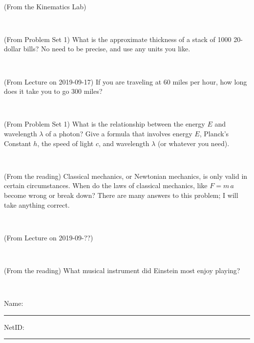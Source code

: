 \documentclass[12pt, letterpaper]{article}
\begin{document}
\vfill ~

\begin{problem} (From the Kinematics Lab)

\end{problem}


\vfill ~

\begin{problem} (From Problem Set 1)
What is the approximate thickness of a stack of 1000 20-dollar bills?
No need to be precise, and use any units you like.
\end{problem}


\vfill ~

\begin{problem} (From Lecture on 2019-09-17)
If you are traveling at 60 miles per hour, how long does
it take you to go 300 miles?
\end{problem}


\vfill ~


\clearpage


\begin{problem} (From Problem Set 1)
What is the relationship between the energy $E$ and wavelength
$\lambda$ of a photon? Give a formula that involves energy $E$,
Planck's Constant $h$, the speed of light $c$, and wavelength
$\lambda$ (or whatever you need).
\end{problem}

\vfill ~

\begin{problem} (From the reading)
Classical mechanics, or Newtonian mechanics, is only valid in certain
circumstances. When do the laws of classical mechanics, like $F =
m\,a$ become wrong or break down? There are many answers to this
problem; I will take anything correct.
\end{problem}


\vfill ~

\begin{problem} (From Lecture on 2019-09-??)
\end{problem}


\vfill ~

\begin{problem} (From the reading)
What musical instrument did Einstein most enjoy playing?
\end{problem}


\vfill ~


\cleardoublepage



\noindent
Name: \rule[-1ex]{0.60\textwidth}{0.1pt}
NetID: \rule[-1ex]{0.20\textwidth}{0.1pt}
\end{document}
